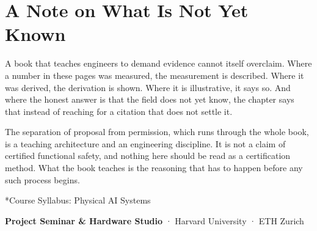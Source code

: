 \documentclass[
  9pt,
  letterpaper,
  open=right,
  numbers=noenddot,
  captions=tableheading]{scrbook}
\makeatletter
\newif\if@firstnumbered%
\newif\if@firstunnumbered%
\newcounter{lastRomanPage}
\let\old@chapter\chapter%
\renewcommand{\chapter}{%
  \@ifstar{\unnumbered@chapter}{\numbered@chapter}%
}
\newcommand{\numbered@chapter}[1]{%
  \if\relax\detokenize{#1}\relax
    \phantomsection%
  \else
    \if@firstnumbered%
      \cleardoublepage%
      \pagenumbering{arabic}%
      \setcounter{page}{3}%
      \@firstnumberedfalse%
    \else
      \setcounter{page}{\value{page}}%
    \fi
    \setcounter{sidenote}{1}                    %
    \old@chapter{#1}%
  \fi
}
\newcommand{\unnumbered@chapter}[1]{%
  \if@firstunnumbered%
    \clearpage
    \pagenumbering{roman}%
    \setcounter{page}{13}%
    \@firstunnumberedfalse%
  \fi
  \setcounter{sidenote}{1}
  \old@chapter*{#1}%
}
\newif\ifmlsys@inside@longtable
\newif\ifmlsys@longtable@numbered
\let\mlsys@orig@label\label
\renewcommand{\label}[1]{%
  \ifmlsys@inside@longtable
    \global\mlsys@longtable@numberedtrue
  \fi
  \mlsys@orig@label{#1}%
}
\let\label\mlsys@orig@label
\makeatother
\begin{document}
\section*{A Note on What Is Not Yet
Known}\label{a-note-on-what-is-not-yet-known}


A book that teaches engineers to demand evidence cannot itself
overclaim. Where a number in these pages was measured, the measurement
is described. Where it was derived, the derivation is shown. Where it is
illustrative, it says so. And where the honest answer is that the field
does not yet know, the chapter says that instead of reaching for a
citation that does not settle it.

The separation of proposal from permission, which runs through the whole
book, is a teaching architecture and an engineering discipline. It is
not a claim of certified functional safety, and nothing here should be
read as a certification method. What the book teaches is the reasoning
that has to happen before any such process begins.


\chapter*{Course Syllabus: Physical AI Systems}\label{sec-syllabus}


\textbf{Project Seminar \& Hardware Studio} · Harvard University · ETH
Zurich
\end{document}
